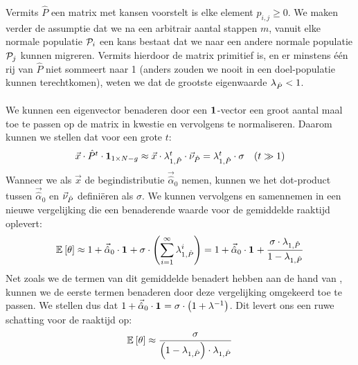 \paragraph{}
Vermits $\hat{P}$ een matrix met kansen voorstelt is elke element $\hat{p}_{i,j}\geq 0$. We maken verder de assumptie dat we na een arbitrair aantal stappen $m$, vanuit elke normale populatie $\calP_i$ een kans bestaat dat we naar een andere normale populatie $\calP_j$ kunnen migreren. Vermits hierdoor de matrix primitief is, en er minstens \'e\'en rij van $\hat{P}$ niet sommeert naar 1 (anders zouden we nooit in een doel-populatie kunnen terechtkomen), weten we dat de grootste eigenwaarde $\ev[\hat{P}]<1$.

\paragraph{}
We kunnen een eigenvector benaderen door een $\onematrix$-vector een groot aantal maal toe te passen op de matrix in kwestie en vervolgens te normaliseren. Daarom kunnen we stellen dat voor een grote $t$:
\begin{equation}
\begin{array}{cc}
\vec{x}\cdot\hat{P}^t\cdot\onematrix[1\times N-g]\approx\vec{x}\cdot\ev[1,\hat{P}]^t\cdot\evr[\hat{P}]=\ev[1,\hat{P}]^t\cdot\sigma&\mbox{($t\gg 1$)}
\end{array}
\eqnlab{longTermAlpha}
\end{equation}
Wanneer we als $\vec{x}$ de begindistributie $\vec{\hat{\alpha}}_0$ nemen, kunnen we het dot-product tussen $\vec{\hat{\alpha}}_0$ en $\evr[\hat{P}]$ defini\"eren als $\sigma$. We kunnen vervolgens  en  samennemen in een nieuwe vergelijking die
een benaderende waarde voor de gemiddelde raaktijd oplevert:
\begin{equation}
\mean{\theta}\approx 1+\vec{\hat{\alpha}}_0\cdot\onematrix+\sigma\cdot\brak{\displaystyle\sum_{i=1}^{\infty}\lambda_{1,\hat{P}}^i}=1+\vec{\hat{\alpha}}_0\cdot\onematrix+\displaystyle\frac{\sigma\cdot \lambda_{1,\hat{P}}}{1-\lambda_{1,\hat{P}}}
\end{equation}
Net zoals we de termen van dit gemiddelde benadert hebben aan de hand van , kunnen we de eerste termen benaderen door deze vergelijking omgekeerd toe te passen. We stellen dus dat $1+\vec{\hat{\alpha}}_0\cdot\onematrix=\sigma\cdot\brak{1+\lambda^{-1}}$. Dit levert ons een ruwe schatting voor de raaktijd op:
\begin{equation}
\mean{\hittime}\approx\displaystyle\frac{\sigma}{\brak{1-\lambda_{1,\hat{P}}}\cdot\lambda_{1,\hat{P}}}
\eqnlab{hitTimeSingle}
\end{equation}

